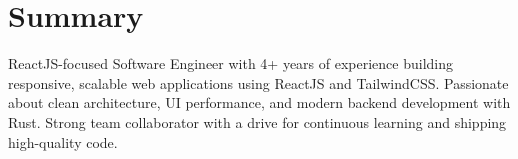 \section*{Summary}
ReactJS-focused Software Engineer with 4+ years of experience building responsive, scalable web applications using ReactJS and TailwindCSS. Passionate about clean architecture, UI performance, and modern backend development with Rust. Strong team collaborator with a drive for continuous learning and shipping high-quality code.
